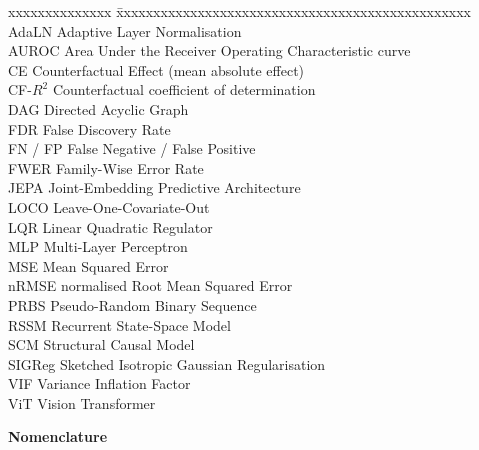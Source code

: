 \documentclass[11pt, a4paper, oneside,enumerate,textcomp]{report}
\newcommand{\Rsq}{R^2}
\begin{document}
\begin{tabbing}
	xxxxxxxxxxxxxx  \=  xxxxxxxxxxxxxxxxxxxxxxxxxxxxxxxxxxxxxxxxxxxxxxxx \kill
	AdaLN \> Adaptive Layer Normalisation \\
	AUROC \> Area Under the Receiver Operating Characteristic curve \\
	CE \> Counterfactual Effect (mean absolute effect) \\
	CF-$\Rsq$ \> Counterfactual coefficient of determination \\
	DAG \> Directed Acyclic Graph \\
	FDR \> False Discovery Rate \\
	FN / FP \> False Negative / False Positive \\
	FWER \> Family-Wise Error Rate \\
	JEPA \> Joint-Embedding Predictive Architecture \\
	LOCO \> Leave-One-Covariate-Out \\
	LQR \> Linear Quadratic Regulator \\
	MLP \> Multi-Layer Perceptron \\
	MSE \> Mean Squared Error \\
	nRMSE \> normalised Root Mean Squared Error \\
	PRBS \> Pseudo-Random Binary Sequence \\
	RSSM \> Recurrent State-Space Model \\
	SCM \> Structural Causal Model \\
	SIGReg \> Sketched Isotropic Gaussian Regularisation \\
	VIF \> Variance Inflation Factor \\
	ViT \> Vision Transformer \\
\end{tabbing}


\vspace{6pt}
{\LARGE\bfseries Nomenclature}\par\vspace{8pt}
\end{document}
